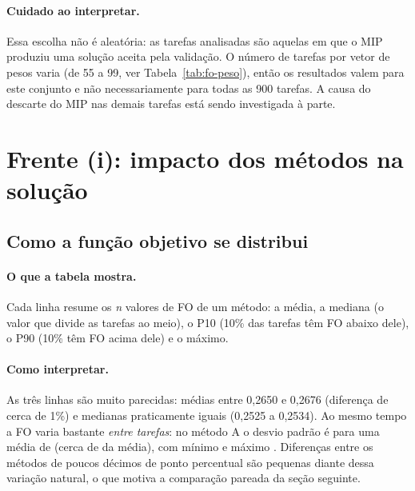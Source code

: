 \documentclass[11pt,a4paper]{article}
\begin{document}
\paragraph{Cuidado ao interpretar.} Essa escolha não é aleatória: as tarefas
analisadas são aquelas em que o MIP produziu uma solução aceita pela validação.
O número de tarefas por vetor de pesos varia (de 55 a 99, ver
Tabela~\ref{tab:fo-peso}), então os resultados valem para este conjunto e não
necessariamente para todas as 900 tarefas. A causa do descarte do MIP nas
demais tarefas está sendo investigada à parte.

\section{Frente (i): impacto dos métodos na solução}

\subsection{Como a função objetivo se distribui}

\begin{table}[H]
  \centering
  \small
  
  \caption{FO por método nas \nPaired{} tarefas analisadas (menor é melhor).}
  \label{tab:fo-dist}
\end{table}

\paragraph{O que a tabela mostra.} Cada linha resume os \emph{n} valores de FO de
um método: a média, a mediana (o valor que divide as tarefas ao meio), o P10 (10\%
das tarefas têm FO abaixo dele), o P90 (10\% têm FO acima dele) e o máximo.

\paragraph{Como interpretar.} As três linhas são muito parecidas: médias entre
0,2650 e 0,2676 (diferença de cerca de 1\%) e medianas praticamente iguais (0,2525 a
0,2534). Ao mesmo tempo a FO varia bastante \emph{entre tarefas}: no método A o desvio
padrão é \sdFOA{} para uma média de \meanFOA{} (cerca de \cvFOA{} da média), com mínimo \minFOA{} e
máximo \maxFOA{}. Diferenças entre os métodos de poucos décimos de ponto percentual são
pequenas diante dessa variação natural, o que motiva a comparação pareada da seção
seguinte.
\end{document}
